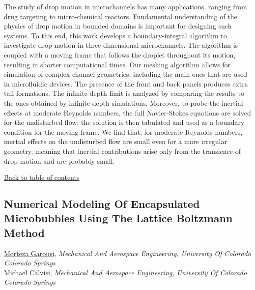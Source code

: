 \noindent The study of drop motion in microchannels has many applications, ranging from drug targeting to micro-chemical reactors. Fundamental understanding of the physics of drop motion in bounded domains is important for designing such systems. To this end, this work develops a boundary-integral algorithm to investigate drop motion in three-dimensional microchannels. The algorithm is coupled with a moving frame that follows the droplet throughout its motion, resulting in shorter computational times. Our meshing algorithm allows for simulation of complex channel geometries, including the main ones that are used in microfluidic devices. The presence of the front and back panels produces extra tail formations. The infinite-depth limit is analyzed by comparing the results to the ones obtained by infinite-depth simulations. Moreover, to probe the inertial effects at moderate Reynolds numbers, the full Navier-Stokes equations are solved for the undisturbed flow; the solution is then tabulated and used as a boundary condition for the moving frame. We find that, for moderate Reynolds numbers, inertial effects on the undisturbed flow are small even for a more irregular geometry, meaning that inertial contributions arise only from the transience of drop motion and are probably small. \\ 
\begin{flushright}\vspace{-0.2 in}\hyperlink{toc}{Back to table of contents}\end{flushright}\vspace{-0.2 in}
\hypertarget{MortezaGarousi}{\subsection*{\color{CUGOLD} Numerical Modeling Of Encapsulated Microbubbles Using The Lattice Boltzmann Method}} \vsp 
\underline{Morteza Garousi}, \textit{Mechanical And Aerospace Engineering, University Of Colorado Colorado Springs}\\ 
{Michael Calvisi}, \textit{Mechanical And Aerospace Engineering, University Of Colorado Colorado Springs}\\ 
\vspace{-0.1 in} \\ 
